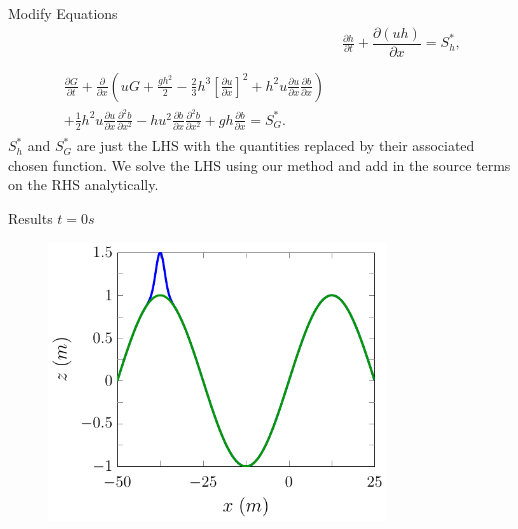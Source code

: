 \documentclass[handout]{beamer}
\begin{document}
\begin{frame}{Modify Equations}
		\begin{align*}
		& \frac{\partial h}{\partial t} + \dfrac{\partial (uh)}{\partial x} = S_h^* ,  \\ \nonumber \\
		\begin{split}
		\frac{\partial G}{\partial t}  + \frac{\partial}{\partial x} \left( {u} G + \frac{gh^2}{2} - \frac{2}{3}h^3 \left[\frac{\partial {u}}{\partial x}\right]^2 + h^2 {u}\frac{\partial {u}}{\partial x}\frac{\partial b}{\partial x} \right) \\ + \frac{1}{2}h^2 {u} \frac{\partial {u}}{\partial x} \frac{\partial^2 b}{\partial x^2}  - h {u}^2\frac{\partial b}{\partial x}\frac{\partial^2 b}{\partial x^2} + gh\frac{\partial b}{\partial x} = S_G^* .
		\end{split}
		\end{align*}
		$S_h^*$ and $S_G^*$ are just the LHS  with the quantities replaced by their associated chosen function. We solve the LHS using our method and add in the source terms on the RHS analytically.
\end{frame}

\begin{frame}{Results $t=0s$}
\begin{figure}
	\includegraphics[width=0.8\textwidth]{./Pics/DryBed/Forced/Stages0.pdf}
\end{figure}
\end{frame}
\end{document}
